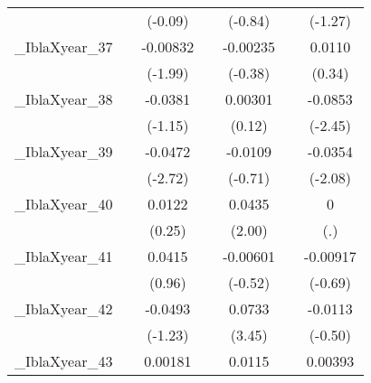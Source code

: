 {\begin{tabular}{l*{6}{c}}
            &                     &     (-0.09)         &                     &     (-0.84)         &                     &     (-1.27)         \\
[1em]
\_IblaXyear\_37&                     &    -0.00832         &                     &    -0.00235         &                     &      0.0110         \\
            &                     &     (-1.99)         &                     &     (-0.38)         &                     &      (0.34)         \\
[1em]
\_IblaXyear\_38&                     &     -0.0381         &                     &     0.00301         &                     &     -0.0853\sym{*}  \\
            &                     &     (-1.15)         &                     &      (0.12)         &                     &     (-2.45)         \\
[1em]
\_IblaXyear\_39&                     &     -0.0472\sym{**} &                     &     -0.0109         &                     &     -0.0354\sym{*}  \\
            &                     &     (-2.72)         &                     &     (-0.71)         &                     &     (-2.08)         \\
[1em]
\_IblaXyear\_40&                     &      0.0122         &                     &      0.0435         &                     &           0         \\
            &                     &      (0.25)         &                     &      (2.00)         &                     &         (.)         \\
[1em]
\_IblaXyear\_41&                     &      0.0415         &                     &    -0.00601         &                     &    -0.00917         \\
            &                     &      (0.96)         &                     &     (-0.52)         &                     &     (-0.69)         \\
[1em]
\_IblaXyear\_42&                     &     -0.0493         &                     &      0.0733\sym{**} &                     &     -0.0113         \\
            &                     &     (-1.23)         &                     &      (3.45)         &                     &     (-0.50)         \\
[1em]
\_IblaXyear\_43&                     &     0.00181         &                     &      0.0115         &                     &     0.00393         \\

\end{tabular}}
